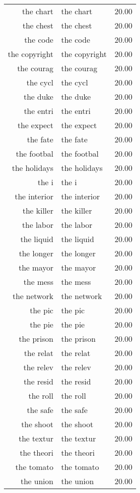 \begin{table}[ht]
\begin{tabular}{rlr}
  the chart & the chart & 20.00 \\ 
  the chest & the chest & 20.00 \\ 
  the code & the code & 20.00 \\ 
  the copyright & the copyright & 20.00 \\ 
  the courag & the courag & 20.00 \\ 
  the cycl & the cycl & 20.00 \\ 
  the duke & the duke & 20.00 \\ 
  the entri & the entri & 20.00 \\ 
  the expect & the expect & 20.00 \\ 
  the fate & the fate & 20.00 \\ 
  the footbal & the footbal & 20.00 \\ 
  the holidays & the holidays & 20.00 \\ 
  the i & the i & 20.00 \\ 
  the interior & the interior & 20.00 \\ 
  the killer & the killer & 20.00 \\ 
  the labor & the labor & 20.00 \\ 
  the liquid & the liquid & 20.00 \\ 
  the longer & the longer & 20.00 \\ 
  the mayor & the mayor & 20.00 \\ 
  the mess & the mess & 20.00 \\ 
  the network & the network & 20.00 \\ 
  the pic & the pic & 20.00 \\ 
  the pie & the pie & 20.00 \\ 
  the prison & the prison & 20.00 \\ 
  the relat & the relat & 20.00 \\ 
  the relev & the relev & 20.00 \\ 
  the resid & the resid & 20.00 \\ 
  the roll & the roll & 20.00 \\ 
  the safe & the safe & 20.00 \\ 
  the shoot & the shoot & 20.00 \\ 
  the textur & the textur & 20.00 \\ 
  the theori & the theori & 20.00 \\ 
  the tomato & the tomato & 20.00 \\ 
  the union & the union & 20.00 \\ 

\end{tabular}
\end{table}

